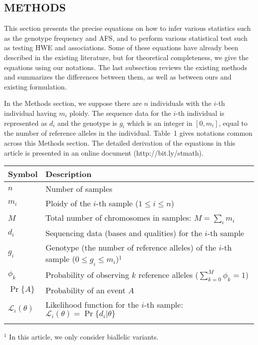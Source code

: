 \documentclass{bioinfo}
\begin{document}
\begin{methods}
\section{METHODS}
This section presents the precise equations on how to infer various statistics
such as the genotype frequency and AFS, and to perform various statistical test
such as testing HWE and associations. Some of these equations have already been
described in the existing literature, but for theoretical completeness, we give
the equations using our notations. The last subsection reviews the existing
methods and summarizes the differences between them, as well as between ours
and existing formulation.

In the Methods section, we suppose there are $n$ individuals with the $i$-th
individual having $m_i$ ploidy. The sequence data for the $i$-th individual is
represented as $d_i$ and the genotype is $g_i$ which is an integer in
$[0,m_i]$, equal to the number of reference alleles in the individual.
Table~1 %
gives notations common across this Methods section. The detailed derivation of
the equations in this article is presented in an online document
(http://bit.ly/stmath).

\begin{table}[!htb]\label{tab:notation}
{\begin{tabular}{lp{7cm}}
\toprule
Symbol & Description \\
\midrule
$n$ & Number of samples \\
$m_i$ & Ploidy of the $i$-th sample ($1\le i\le n$)\\
$M$ & Total number of chromosomes in samples: $M=\sum_i m_i$\\
$d_i$ & Sequencing data (bases and qualities) for the $i$-th sample\\
$g_i$ & Genotype (the number of reference alleles) of the $i$-th sample \mbox{($0\le g_i\le m_i$)}$^1$\\
$\phi_k$ & Probability of observing $k$ reference alleles ($\sum_{k=0}^M\phi_k=1$) \\
$\Pr\{A\}$ & Probability of an event $A$\\
$\mathcal{L}_i(\theta)$ & Likelihood function for the $i$-th sample: $\mathcal{L}_i(\theta)=\Pr\{d_i|\theta\}$ \\
\botrule
\end{tabular}}{$^1$ In this article, we only consider biallelic variants.}
\end{table}


\end{methods}
\end{document}

